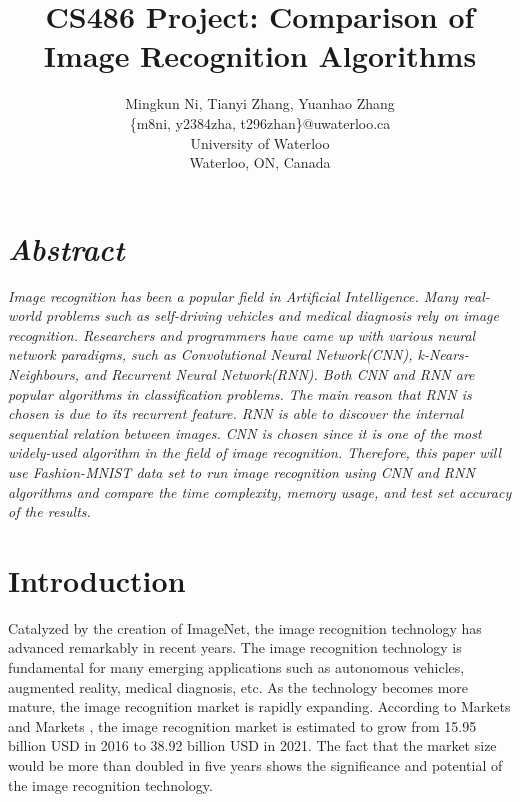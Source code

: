 \documentclass[letterpaper]{article} %
\begin{document}
%
\title{CS486 Project: Comparison of Image Recognition Algorithms}
\author{Mingkun Ni, Tianyi Zhang, Yuanhao Zhang\\
\{m8ni, y2384zha, t296zhan\}@uwaterloo.ca\\
University of Waterloo\\
Waterloo, ON, Canada\\
}
\maketitle


\section{\em{Abstract}}
\textit{Image recognition has been a popular field in Artificial Intelligence. Many real-world problems such as self-driving vehicles and medical diagnosis rely on image recognition. Researchers and programmers have came up with various neural network paradigms, such as Convolutional Neural Network(CNN), k-Nears-Neighbours, and Recurrent Neural Network(RNN). Both CNN and RNN are popular algorithms in classification problems. The main reason that RNN is chosen is due to its recurrent feature. RNN is able to discover the internal sequential relation between images. CNN is chosen since it is one of the most widely-used algorithm in the field of image recognition. Therefore, this paper will use Fashion-MNIST data set to run image recognition using CNN and RNN algorithms and compare the time complexity, memory usage, and test set accuracy of the results.}


\section{Introduction}
Catalyzed by the creation of ImageNet, the image recognition technology has advanced remarkably in recent years. The image recognition technology is fundamental for many emerging applications such as autonomous vehicles, augmented reality, medical diagnosis, etc. As the technology becomes more mature, the image recognition market is rapidly expanding. According to Markets and Markets \cite{marketsandmarkets2017image}, the image recognition market is estimated to grow from 15.95 billion USD in 2016 to 38.92 billion USD in 2021. The fact that the market size would be more than doubled in five years shows the significance and potential of the image recognition technology.
\end{document}
